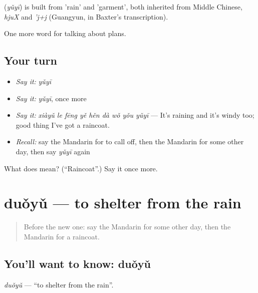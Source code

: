 \begin{cousinweb}
\textbf{} (\emph{yǔyī}) is built from  'rain' and  'garment', both inherited from Middle Chinese, \emph{hjuX} and \emph{'j+j} (Guangyun, in Baxter's transcription).
\end{cousinweb}

\begin{grammarlens}[title={What you've built}]
One more word for talking about plans.
\end{grammarlens}

\subsection*{Your turn}
\begin{itemize}
\raggedright
  \item \emph{Say it:} \emph{yǔyī}
  \item \emph{Say it:} \emph{yǔyī}, once more
  \item \emph{Say it:} \emph{xiàyǔ le fēng yě hěn dà wǒ yǒu yǔyī} — It's raining and it's windy too; good thing I've got a raincoat.
  \item \emph{Recall:} say the Mandarin for to call off, then the Mandarin for some other day, then say \emph{yǔyī} again
\end{itemize}

\begin{tcolorbox}[breakable,colback=teal!4,colframe=teal!35!black,title={Before you move on}]
What does  mean? (\textquotedblleft{}Raincoat\textquotedblright{}.) Say it once more.
\end{tcolorbox}
\section[duǒyǔ]{duǒyǔ — to shelter from the rain}

\label{lesson:ZH-C234-duoyu}



\begin{quote}
Before the new one: say the Mandarin for some other day, then the Mandarin for a raincoat.
\end{quote}

\subsection*{You'll want to know: duǒyǔ}
\emph{duǒyǔ} — \textquotedblleft{}to shelter from the rain\textquotedblright{}.

